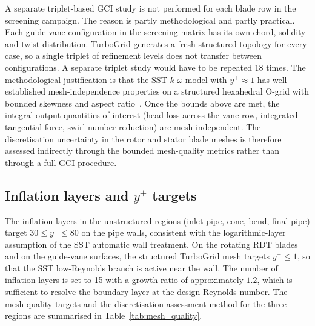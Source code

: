 A separate triplet-based GCI study is not performed for each blade row in the screening campaign. The reason is partly methodological and partly practical. Each guide-vane configuration in the screening matrix has its own chord, solidity and twist distribution. TurboGrid generates a fresh structured topology for every case, so a single triplet of refinement levels does not transfer between configurations. A separate triplet study would have to be repeated 18 times. The methodological justification is that the SST $k$-$\omega$ model with $y^+ \approx 1$ has well-established mesh-independence properties on a structured hexahedral O-grid with bounded skewness and aspect ratio~\cite{Menter1994}. Once the bounds above are met, the integral output quantities of interest (head loss across the vane row, integrated tangential force, swirl-number reduction) are mesh-independent. The discretisation uncertainty in the rotor and stator blade meshes is therefore assessed indirectly through the bounded mesh-quality metrics rather than through a full GCI procedure.

\subsection{Inflation layers and $y^+$ targets}
\label{sec:methods_inflation}

The inflation layers in the unstructured regions (inlet pipe, cone, bend, final pipe) target $30 \leq y^+ \leq 80$ on the pipe walls, consistent with the logarithmic-layer assumption of the SST automatic wall treatment. On the rotating RDT blades and on the guide-vane surfaces, the structured TurboGrid mesh targets $y^+ \leq 1$, so that the SST low-Reynolds branch is active near the wall. The number of inflation layers is set to 15 with a growth ratio of approximately $1.2$, which is sufficient to resolve the boundary layer at the design Reynolds number. The mesh-quality targets and the discretisation-assessment method for the three regions are summarised in Table~\ref{tab:mesh_quality}.

